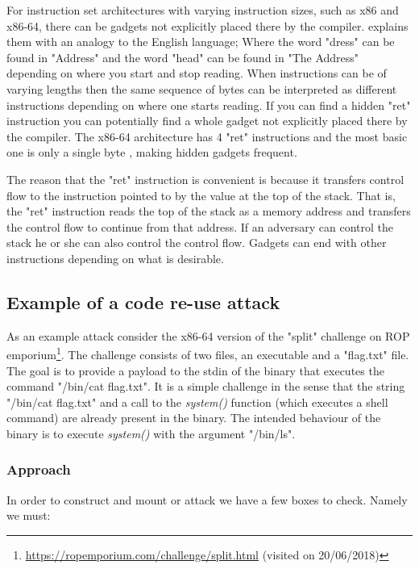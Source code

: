 For instruction set architectures with varying instruction sizes, such as x86 and x86-64,
there can be gadgets not explicitly placed there by the compiler. \textcite{rop} explains
them with an analogy to the English language; Where the word "dress" can be found in
"Address" and the word "head" can be found in "The Address" depending on where you start
and stop reading. When instructions can be of varying lengths then the same sequence of
bytes can be interpreted as different instructions depending on where one starts reading.
If you can find a hidden "ret" instruction you can potentially find a whole gadget not
explicitly placed there by the compiler. The x86-64 architecture has 4 "ret" instructions
and the most basic one is only a single byte \cite{x86-ret}, making hidden gadgets frequent.

The reason that the "ret" instruction is convenient is because it transfers control flow
to the instruction pointed to by the value at the top of the stack. That is, the "ret"
instruction reads the top of the stack as a memory address and transfers the control flow
to continue from that address. If an adversary can control the stack he or she can also
control the control flow. Gadgets can end with other instructions depending on what is
desirable.

\subsection{Example of a code re-use attack}

As an example attack consider the x86-64 version of the "split" challenge on ROP emporium\footnote{\url{https://ropemporium.com/challenge/split.html} (visited on 20/06/2018)}.
The challenge consists of two files, an executable and a "flag.txt" file. The goal is to
provide a payload to the stdin of the binary that executes the command "/bin/cat flag.txt".
It is a simple challenge in the sense that the string "/bin/cat flag.txt" and a call to
the \textit{system()} function (which executes a shell command) are already present in the
binary. The intended behaviour of the binary is to execute \textit{system()} with the
argument "/bin/ls".

\subsubsection{Approach}

In order to construct and mount or attack we have a few boxes to check. Namely we must:

